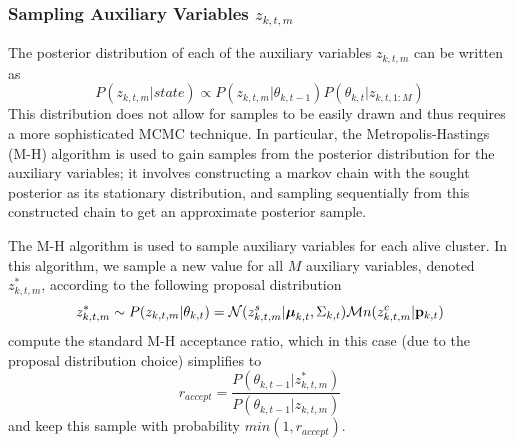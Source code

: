 \documentclass[smallcondensed, final]{svjour3}
\begin{document}

\subsubsection{Sampling Auxiliary Variables $z_{k,t,m}$}
The posterior distribution of each of the auxiliary variables $z_{k,t,m}$ can be written as
\begin{equation}
P(z_{k,t,m} | state) \propto  P(z_{k,t,m} | \theta_{k,t-1}) P(\theta_{k,t} | z_{k,t,1:M})
\end{equation}
This distribution does not allow for samples to be easily drawn and thus requires a more sophisticated MCMC technique. In particular, the Metropolis-Hastings (M-H) algorithm is used to gain samples from the posterior distribution for the auxiliary variables; it involves constructing a markov chain with the sought posterior as its stationary distribution, and sampling sequentially from this constructed chain to get an approximate posterior sample.

The M-H algorithm is used to sample auxiliary variables for each alive cluster. In this algorithm, we sample a new value for all $M$ auxiliary variables, denoted $z_{k,t,m}^{*}$, according to the following proposal distribution
\begin{equation}
z_{k,t,m}^{*}  \sim  P(z_{k,t,m} | \theta_{k,t}) = \mathcal{N}(z_{k,t,m}^{s} | \boldsymbol{\mu}_{k,t}, \Sigma_{k,t}) \mathcal{M}n(z_{k,t,m}^{c} | \bold{p}_{k,t})
\end{equation}
compute the standard M-H acceptance ratio, which in this case (due to the proposal distribution choice) simplifies to 
\begin{equation}
r_{accept} = \frac{P(\theta_{k,t-1} | z_{k,t,m}^{*})}{P(\theta_{k,t-1} | z_{k,t,m})}
\end{equation}
and keep this sample with probability $min(1, r_{accept})$.
\end{document}
